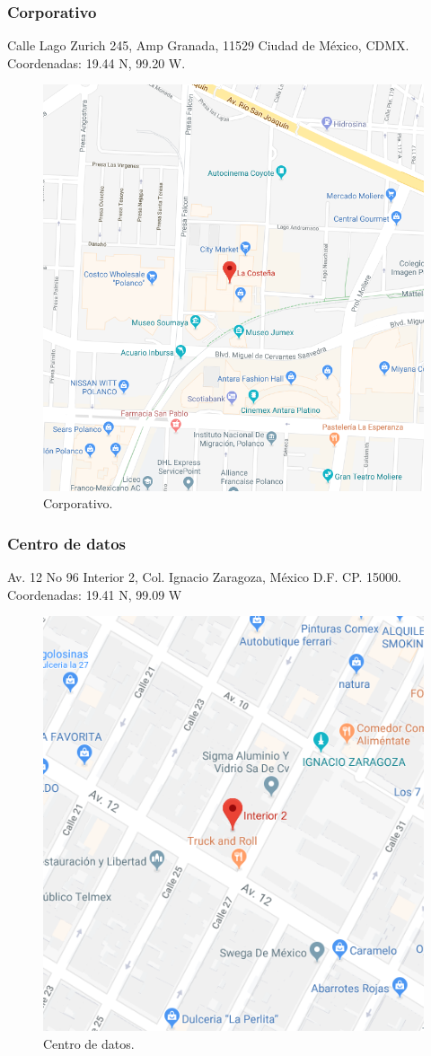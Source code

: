 \documentclass[12pt,letterpaper]{article}
\begin{document}
\subsubsection{Corporativo}
Calle Lago Zurich 245, Amp Granada, 11529 Ciudad de México, CDMX.
\\ Coordenadas: 19.44 N, 99.20 W.
\begin{figure}[ht]
    \centering
    \includegraphics[width=.7\textwidth]{imagenes/corporativo.png}
    \caption{Corporativo.}
\end{figure}

\newpage
\subsubsection{Centro de datos}
Av. 12 No 96 Interior 2, Col. Ignacio Zaragoza, México D.F. CP. 15000.
\\ Coordenadas: 19.41 N, 99.09 W
\begin{figure}[ht]
    \centering
    \includegraphics[width=.8\textwidth]{imagenes/centrodatos.png}
    \caption{Centro de datos.}
\end{figure}
\end{document}
